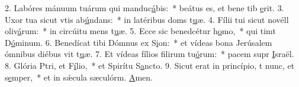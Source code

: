 2. Labóres mánuum tuárum qui manduc\uline{á}bis:~* beátus es, et bene tib \uline{e}rit.
3. Uxor tua sicut vtis ab\uline{ú}ndans:~* in latéribus doms t\uline{u}æ.
4. Fílii tui sicut novéll oliv\uline{á}rum:~* in circúitu mens t\uline{u}æ.
5. Ecce sic benedcétur h\uline{o}mo,~* qui timt D\uline{ó}minum.
6. Benedícat tibi Dómnus ex S\uline{i}on:~* et vídeas bona Jerúsalem ómnibus diébus vit t\uline{u}æ.
7. Et vídeas fílios filirum tu\uline{ó}rum:~* pacem supr \uline{I}sraël.
8. Glória Ptri, et F\uline{í}lio,~* et Spirítu S\uline{a}ncto.
9. Sicut erat in princípio, t nunc, et s\uline{e}mper,~* et in sǽcula sæculórm. \uline{A}men.
